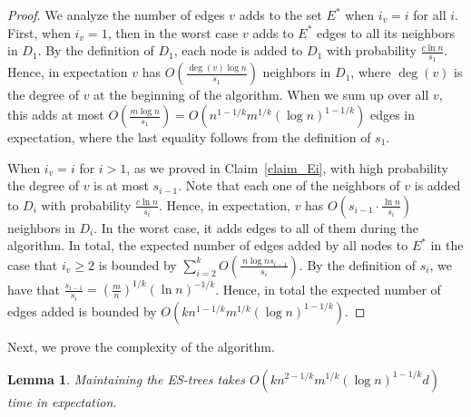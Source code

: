 \documentclass[11pt]{article}
\newtheorem{lemma}[theorem]{Lemma}
\theoremstyle{definition}
\theoremstyle{remark}
\begin{document}
\begin{proof}
We analyze the number of edges $v$ adds to the set $E^*$ when $i_v=i$ for all $i$. First, when $i_v=1$, then in the worst case $v$ adds to $E^*$ edges to all its neighbors in $D_1$. By the definition of $D_1$, each node is added to $D_1$ with probability $\frac{c\ln{n}}{s_1}$. Hence, in expectation $v$ has $O(\frac{\deg(v) \log{n}}{s_1})$ neighbors in $D_1$, where $\deg(v)$ is the degree of $v$ at the beginning of the algorithm. When we sum up over all $v$, this adds at most $O(\frac{m \log{n}}{s_1})=O(n^{1-1/k}m^{1/k}(\log{n})^{1-1/k})$ edges in expectation, where the last equality follows from the definition of $s_1$.

When $i_v=i$ for $i > 1$, as we proved in Claim~\ref{claim_Ei}, with high probability the degree of $v$ is at most $s_{i-1}$. Note that each one of the neighbors of $v$ is added to $D_i$ with probability $\frac{c\ln{n}}{s_i}$. Hence, in expectation, $v$ has $O(s_{i-1} \cdot \frac{\ln{n}}{s_i})$ neighbors in $D_i$. In the worst case, it adds edges to all of them during the algorithm. In total, the expected number of edges added by all nodes to $E^*$ in the case that $i_v \geq 2$ is bounded by $\sum_{i=2}^{k} O(\frac{\ n \log{n} s_{i-1}}{s_i})$.
By the definition of $s_i$, we have that $\frac{s_{i-1}}{s_i}=(\frac{m}{n})^{1/k}(\ln{n})^{-1/k}$. Hence, in total the expected number of edges added is bounded by $O(k n^{1-1/k}m^{1/k}(\log{n})^{1-1/k}).$
\end{proof}

Next, we prove the complexity of the algorithm. 

\begin{lemma}\label{lemma_time_additive}
Maintaining the ES-trees takes $O(kn^{2-1/k}m^{1/k}(\log{n})^{1-1/k} d)$ time in expectation.
\end{lemma}
\end{document}
